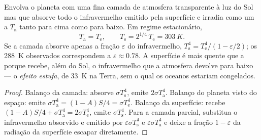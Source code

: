 \begin{proposition}\label{prop:b2:thermal-radiation:greenhouse}
Envolva o planeta com uma fina camada de atmosfera transparente
à luz do Sol mas que absorve todo o infravermelho emitido pela superfície e
irradia como um  a $T_{\text{a}}$ tanto para cima como para baixo. Em
regime estacionário,
\[
T_{\text{a}} = T_{\text{e}}, \qquad
T_{\text{s}} = 2^{1/4}\,T_{\text{e}} = \qty{303}{K} .
\]
Se a camada absorve apenas a fração $\varepsilon$ do infravermelho,
$T_{\text{s}}^4 = T_{\text{e}}^4/(1 - \varepsilon/2)$; os \qty{288}{K}
observados correspondem a $\varepsilon \approx 0.78$. A superfície é
mais quente que a  porque recebe, além
do Sol, o infravermelho que a atmosfera devolve para baixo --- o
\emph{efeito estufa}, de \qty{33}{K} na Terra,
sem o qual os oceanos estariam congelados.
\end{proposition}

\begin{proof}
Balanço da camada: absorve $\sigma T_{\text{s}}^4$, emite $2\sigma
T_{\text{a}}^4$. Balanço do planeta visto do espaço: emite $\sigma
T_{\text{a}}^4 = (1 - A)S/4 = \sigma T_{\text{e}}^4$. Balanço da
superfície: recebe $(1 - A)S/4 + \sigma T_{\text{a}}^4 = 2\sigma T_{\text{e}}^4$,
emite $\sigma T_{\text{s}}^4$. Para a camada parcial, substitua o
infravermelho absorvido e emitido por $\varepsilon\sigma T_{\text{s}}^4$ e
$\varepsilon\sigma T_{\text{a}}^4$ e deixe a fração $1 - \varepsilon$
da radiação da superfície escapar diretamente.
\end{proof}

